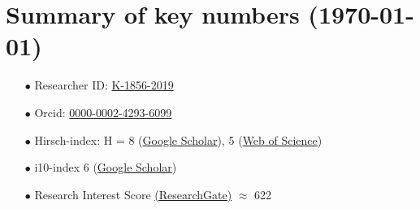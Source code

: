 \documentclass[11pt,a4paper,roman,english,colorlinks,linkcolor=true]{moderncv}
\begin{document}
\section{\textbf{Summary of key numbers (\today)}}
\begin{enumerate}[leftmargin=2.5cm]
	\item[$\bullet$] Researcher ID: \href{https://www.webofscience.com/wos/author/record/K-1856-2019}{K-1856-2019}
	\item[$\bullet$] Orcid: \href{https://orcid.org/0000-0002-4293-6099}{0000-0002-4293-6099}
	\item[$\bullet$] Hirsch-index: H = 8 (\href{https://scholar.google.com/citations?hl=en&user=67aQviYAAAAJ}{Google Scholar}), 5 (\href{https://www.webofscience.com/wos/author/record/K-1856-2019}{Web of Science})
	\item[$\bullet$] i10-index 6 (\href{https://scholar.google.com/citations?hl=en&user=67aQviYAAAAJ}{Google Scholar})
	\item[$\bullet$] Research Interest Score \href{https://www.researchgate.net/profile/Vatsal-Sanjay-2}{(ResearchGate)} $\approx$ 622
\end{enumerate}
\end{document}
